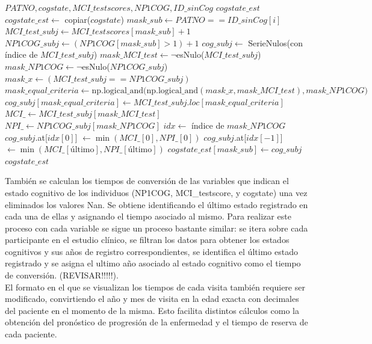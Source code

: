 \begin{algorithm}
	\caption{estimate\_cogstate\_sin}
	\begin{algorithmic}
		\REQUIRE $PATNO, cogstate, MCI\_testscores, NP1COG, ID\_sinCog$
		\ENSURE $cogstate\_est$
		\STATE $cogstate\_est \leftarrow$ copiar($cogstate$)
		\STATE $mask\_sub \leftarrow PATNO == ID\_sinCog[i]$
		\STATE $MCI\_test\_subj \leftarrow MCI\_testscores[mask\_sub] + 1$
		\STATE $NP1COG\_subj \leftarrow (NP1COG[mask\_sub] > 1) + 1$
		\STATE $cog\_subj \leftarrow$ SerieNulos(con índice de $MCI\_test\_subj$)
		\STATE $mask\_MCI\_test \leftarrow \neg$esNulo($MCI\_test\_subj$)
		\STATE $mask\_NP1COG \leftarrow \neg$esNulo($NP1COG\_subj$)
		\STATE $mask\_x \leftarrow (MCI\_test\_subj == NP1COG\_subj)$
		\STATE $mask\_equal\_criteria \leftarrow \text{np.logical\_and(np.logical\_and}(mask\_x, mask\_MCI\_test), mask\_NP1COG)$
		\STATE $cog\_subj[mask\_equal\_criteria] \leftarrow MCI\_test\_subj.loc[mask\_equal\_criteria]$
		\ELSE
		\STATE $MCI\_ \leftarrow MCI\_test\_subj[mask\_MCI\_test]$
		\STATE $NPI\_ \leftarrow NP1COG\_subj[mask\_NP1COG]$
		\STATE $idx \leftarrow$ índice de $mask\_NP1COG$
		\STATE $cog\_subj$.at[$idx[0]$] $\leftarrow \min(MCI\_[0], NPI\_[0])$
		\STATE $cog\_subj$.at[$idx[-1]$] $\leftarrow \min(MCI\_[\text{último}], NPI\_[\text{último}])$
		\ENDIF
		\ENDIF
		\STATE $cogstate\_est[mask\_sub] \leftarrow cog\_subj$
		\ENDFOR
		\RETURN $cogstate\_est$
	\end{algorithmic}
\end{algorithm}

También se calculan los tiempos de conversión de las variables que  indican el estado cognitivo de los individuos (NP1COG, MCI\_testscore, y cogstate) una vez eliminados los valores Nan. Se obtiene identificando el último estado registrado en cada una de ellas y asignando el tiempo asociado al mismo. Para realizar este proceso con cada variable se sigue un proceso bastante similar: se itera sobre cada participante en el estudio clínico, se filtran los datos para obtener los estados cognitivos y sus años de registro correspondientes, se identifica el último estado registrado y se asigna el ultimo año asociado al estado cognitivo como el tiempo de conversión.  (REVISAR!!!!!).\\

El formato en el que se visualizan los tiempos de cada visita también requiere ser modificado, convirtiendo el año y mes de visita en la edad exacta con decimales del paciente en el momento de la misma. Esto facilita distintos cálculos como la obtención del pronóstico de progresión de la enfermedad y el tiempo de reserva de cada paciente.\\

